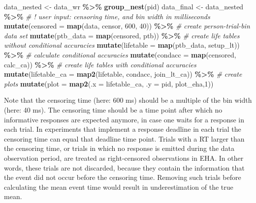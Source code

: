 \documentclass[
  man, donotrepeattitle,floatsintext]{apa6}
\newenvironment{Shaded}{\begin{snugshade}}{\end{snugshade}}
\newcommand{\AttributeTok}[1]{\textcolor[rgb]{0.13,0.29,0.53}{#1}}
\newcommand{\CommentTok}[1]{\textcolor[rgb]{0.56,0.35,0.01}{\textit{#1}}}
\newcommand{\DecValTok}[1]{\textcolor[rgb]{0.00,0.00,0.81}{#1}}
\newcommand{\FunctionTok}[1]{\textcolor[rgb]{0.13,0.29,0.53}{\textbf{#1}}}
\newcommand{\NormalTok}[1]{#1}
\newcommand{\OtherTok}[1]{\textcolor[rgb]{0.56,0.35,0.01}{#1}}
\newcommand{\SpecialCharTok}[1]{\textcolor[rgb]{0.81,0.36,0.00}{\textbf{#1}}}
\begin{document}
\begin{Shaded}
\begin{Highlighting}[]
\NormalTok{data\_nested }\OtherTok{\textless{}{-}}\NormalTok{ data\_wr }\SpecialCharTok{\%\textgreater{}\%} \FunctionTok{group\_nest}\NormalTok{(pid)}
\NormalTok{data\_final }\OtherTok{\textless{}{-}}\NormalTok{ data\_nested }\SpecialCharTok{\%\textgreater{}\%} 
  \CommentTok{\# ! user input: censoring time, and bin width in milliseconds}
  \FunctionTok{mutate}\NormalTok{(}\AttributeTok{censored =} \FunctionTok{map}\NormalTok{(data, censor, }\DecValTok{600}\NormalTok{, }\DecValTok{40}\NormalTok{)) }\SpecialCharTok{\%\textgreater{}\%}   
  \CommentTok{\# create person{-}trial{-}bin data set}
  \FunctionTok{mutate}\NormalTok{(}\AttributeTok{ptb\_data =} \FunctionTok{map}\NormalTok{(censored, ptb)) }\SpecialCharTok{\%\textgreater{}\%}          
  \CommentTok{\# create life tables without conditional accuracies}
  \FunctionTok{mutate}\NormalTok{(}\AttributeTok{lifetable =} \FunctionTok{map}\NormalTok{(ptb\_data, setup\_lt)) }\SpecialCharTok{\%\textgreater{}\%}   
  \CommentTok{\# calculate conditional accuracies}
  \FunctionTok{mutate}\NormalTok{(}\AttributeTok{condacc =} \FunctionTok{map}\NormalTok{(censored, calc\_ca)) }\SpecialCharTok{\%\textgreater{}\%}      
  \CommentTok{\# create life tables with conditional accuracies}
  \FunctionTok{mutate}\NormalTok{(}\AttributeTok{lifetable\_ca =} \FunctionTok{map2}\NormalTok{(lifetable, condacc, join\_lt\_ca)) }\SpecialCharTok{\%\textgreater{}\%}    
  \CommentTok{\# create plots }
  \FunctionTok{mutate}\NormalTok{(}\AttributeTok{plot =} \FunctionTok{map2}\NormalTok{(}\AttributeTok{.x =}\NormalTok{ lifetable\_ca, }\AttributeTok{.y =}\NormalTok{ pid, plot\_eha,}\DecValTok{1}\NormalTok{))  }
\end{Highlighting}
\end{Shaded}

\normalsize

Note that the censoring time (here: 600 ms) should be a multiple of the bin width (here: 40 ms). The censoring time should be a time point after which no informative responses are expected anymore, in case one waits for a response in each trial. In experiments that implement a response deadline in each trial the censoring time can equal that deadline time point. Trials with a RT larger than the censoring time, or trials in which no response is emitted during the data observation period, are treated as right-censored observations in EHA. In other words, these trials are not discarded, because they contain the information that the event did not occur before the censoring time. Removing such trials before calculating the mean event time would result in underestimation of the true mean.
\end{document}
